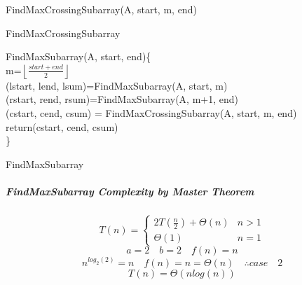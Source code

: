 \documentclass[12pt,letterpaper]{article}
\begin{document}
\begin{algorithm}[htb!]
\SetAlgoLined
FindMaxCrossingSubarray(A, start, m, end)
\caption{FindMaxCrossingSubarray}
\label{FindMaxCrossingSubarray}
\end{algorithm}
\begin{algorithm}[htb!]
\SetAlgoLined
FindMaxSubarray(A, start, end)\{ \\
m=$ \left \lfloor \frac{start+end}{2} \right \rfloor$\\
(lstart, lend, lsum)=FindMaxSubarray(A, start, m)\\
(rstart, rend, rsum)=FindMaxSubarray(A, m+1, end)\\
(cstart, cend, csum) = FindMaxCrossingSubarray(A, start, m, end)\\
return(cstart, cend, csum)\\
\}
\caption{FindMaxSubarray}
\label{FindMaxSubarray}
\end{algorithm}
\pagebreak
\subparagraph{FindMaxSubarray Complexity by Master Theorem}
\[ T(n)=\begin{cases} 2T(\frac{n}{2})+\Theta(n) & n>1 \\ \Theta(1) & n=1 \end{cases} \]
\[a=2 \quad b=2 \quad f(n)=n\]
\[ n^{log_2(2)}=n \quad f(n)=n=\Theta(n)\quad \therefore case \quad 2 \]
\[T(n)=\Theta(nlog(n))\]
\end{document}
